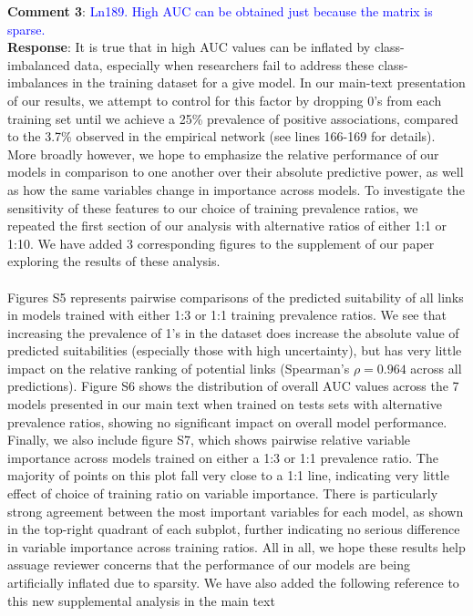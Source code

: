 \documentclass{article}
\begin{document}
    \textbf{Comment 3}: \textcolor{blue}{Ln189. High AUC can be obtained just because the matrix is sparse.}
    \\
    \textbf{Response}: It is true that in high AUC values can be inflated by class-imbalanced data, especially when researchers fail to address these class-imbalances in the training dataset for a give model. In our main-text presentation of our results, we attempt to control for this factor by dropping 0's from each training set until we achieve a 25\% prevalence of positive associations, compared to the 3.7\% observed in the empirical network (see lines 166-169 for details). More broadly however, we hope to emphasize the relative performance of our models in comparison to one another over their absolute predictive power, as well as how the same variables change in importance across models. To investigate the sensitivity of these features to our choice of training prevalence ratios, we repeated the first section of our analysis with alternative ratios of either 1:1 or 1:10. We have added 3 corresponding figures to the supplement of our paper exploring the results of these analysis. 
    \paragraph{}
    Figures S5 represents pairwise comparisons of the predicted suitability of all links in models trained with either 1:3 or 1:1 training prevalence ratios. We see that increasing the prevalence of 1's in the dataset does increase the absolute value of predicted suitabilities (especially those with high uncertainty), but has very little impact on the relative ranking of potential links (Spearman's $\rho = 0.964$ across all predictions). Figure S6 shows the distribution of overall AUC values across the 7 models presented in our main text when trained on tests sets with alternative prevalence ratios, showing no significant impact on overall model performance. Finally, we also include figure S7, which shows pairwise relative variable importance across models trained on either a 1:3 or 1:1 prevalence ratio. The majority of points on this plot fall very close to a 1:1 line, indicating very little effect of choice of training ratio on variable importance. There is particularly strong agreement between the most important variables for each model, as shown in the top-right quadrant of each subplot, further indicating no serious difference in variable importance across training ratios. All in all, we hope these results help assuage reviewer concerns that the performance of our models are being artificially inflated due to sparsity. We have also added the following reference to this new supplemental analysis in the main text
\end{document}
